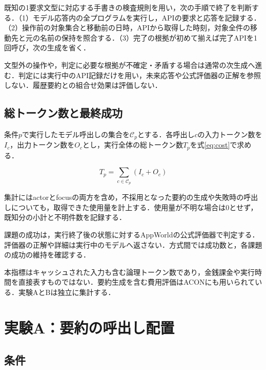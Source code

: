 \documentclass[letter]{ieicej}
\begin{document}
既知の1要求文型に対応する手書きの検査規則を用い，次の手順で終了を判断する．（1）モデル応答内の全プログラムを実行し，APIの要求と応答を記録する．（2）操作前の対象集合と移動前の日時，APIから取得した時刻，対象全件の移動先と元の名前の保持を照合する．（3）完了の根拠が初めて揃えば完了APIを1回呼び，次の生成を省く．

文型外の操作や，判定に必要な根拠が不確定・矛盾する場合は通常の次生成へ進む．判定には実行中のAPI記録だけを用い，未来応答や公式評価器の正解を参照しない．履歴要約との組合せ効果は評価しない．

\newpage
\begin{samepage}
\subsection{総トークン数と最終成功}

条件$p$で実行したモデル呼出しの集合を$\mathcal C_p$とする．各呼出し$c$の入力トークン数を$I_c$，出力トークン数を$O_c$とし，実行全体の総トークン数$T_p$を\mbox{式\eqref{eq:cost}で求める．}

\begin{equation}
 T_p=\sum_{c\in\mathcal C_p}(I_c+O_c)
 \label{eq:cost}
\end{equation}

集計にはactorとfocusの両方を含め，不採用となった要約の生成や失敗時の呼出しについても，取得できた使用量を計上する．使用量が不明な場合は0とせず，既知分の小計と不明件数を記録する．
\end{samepage}

課題の成功は，実行終了後の状態に対するAppWorld\cite{trivedi2024appworld}の公式評価器で判定する．評価器の正解や詳細は実行中のモデルへ返さない．方式間では成功数と，各課題の成功の維持を確認する．

本指標はキャッシュされた入力も含む論理トークン数であり，金銭課金や実行時間を直接表すものではない\cite{xu2026tokenpilot}．要約生成を含む費用評価はACON\cite{kang2026acon}にも用いられている．実験AとBは独立に集計する．

\newpage
\section{実験A：要約の呼出し配置}

\subsection{条件}
\end{document}
